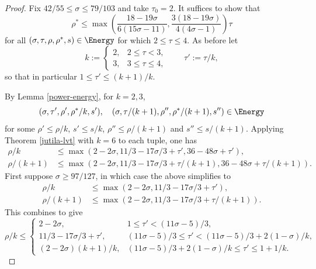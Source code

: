 \begin{proof}
Fix $42/55 \le \sigma \le 79/103$ and take $\tau_0 = 2$. It suffices to show that
\[
\rho^* \le \max\left(\frac{18 - 19\sigma}{6(15\sigma - 11)}, \frac{3(18-19\sigma)}{4(4\sigma-1)}\right)\tau
\]
for all $(\sigma, \tau, \rho, \rho^*, s) \in \Energy$ for which $2 \le \tau \le 4$. As before let
\[
k := \begin{cases}
2,& 2 \le \tau < 3,\\
3,& 3 \le \tau \le 4,
\end{cases}\qquad \tau' := \tau/k,
\]
so that in particular $1 \le \tau' \le (k + 1)/k$.

By Lemma \ref{power-energy}, for $k = 2, 3$,
\begin{equation}\label{ze-bound6-tuples}
(\sigma, \tau', \rho', \rho^*/k, s'),\quad (\sigma, \tau/(k + 1), \rho'', \rho^*/(k + 1), s'') \in \Energy
\end{equation}
for some $\rho' \le \rho/k$, $s' \le s/k$, $\rho'' \le \rho/(k + 1)$ and $s'' \le s/(k + 1)$.
Applying Theorem \ref{jutila-lvt} with $k = 6$ to each tuple, one has
\begin{equation}\label{ze-bound6-rho-bound}
\begin{split}
\rho/k &\le \max(2 - 2\sigma, 11/3 - 17\sigma/3 + \tau', 36 - 48\sigma + \tau'),\\
\rho/(k + 1) &\le \max(2 - 2\sigma, 11/3 - 17\sigma/3 + \tau/(k + 1), 36 - 48\sigma + \tau/(k + 1)).
\end{split}
\end{equation}
First suppose $\sigma \ge 97/127$, in which case the above simplifies to
\begin{align*}
\rho/k &\le \max(2 - 2\sigma, 11/3 - 17\sigma/3 + \tau'),\\
\rho/(k + 1) &\le \max(2 - 2\sigma, 11/3 - 17\sigma/3 + \tau/(k + 1)).
\end{align*}
This combines to give
\begin{equation}\label{ze-bound6-rho}
\rho/k \le \begin{cases}
2 - 2\sigma,&1 \le \tau' < (11\sigma - 5)/3,\\
11/3 - 17\sigma/3 + \tau',& (11\sigma - 5)/3 \le \tau' < (11\sigma - 5)/3 + 2(1 - \sigma)/k,\\
(2 - 2\sigma)(k + 1)/k,& (11\sigma - 5)/3 + 2(1 - \sigma)/k \le \tau' \le 1 + 1/k.
\end{cases}
\end{equation}


\end{proof}
